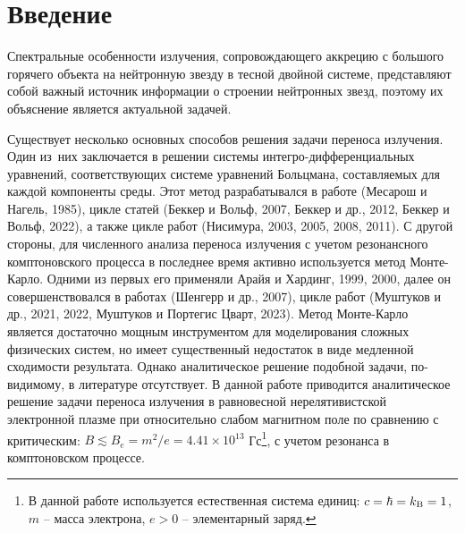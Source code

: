\documentclass{pazh2col-win}
\begin{document}


\section{Введение}
\label{introduction}

Спектральные особенности излучения, сопровождающего аккрецию с большого горячего объекта на нейтронную звезду в тесной двойной системе, представляют собой важный источник информации о строении нейтронных звезд, поэтому их объяснение является актуальной задачей.


Существует несколько основных способов решения задачи переноса излучения. Один из~них заключается в решении системы интегро-дифференциальных уравнений, соответствующих системе уравнений Больцмана, составляемых для каждой компоненты среды. Этот метод разрабатывался в работе (Месарош и Нагель, 1985), цикле статей (Беккер и Вольф, 2007, Беккер и др., 2012, Беккер и Вольф, 2022), а также цикле работ (Нисимура, 2003, 2005, 2008, 2011). С другой стороны, для численного анализа переноса излучения с учетом резонансного комптоновского процесса в последнее время активно используется метод Монте-Карло. Одними из первых его применяли Арайя и Хардинг, 1999, 2000, далее он совершенствовался в работах (Шенгерр и др., 2007), цикле работ (Муштуков и др., 2021, 2022, Муштуков и Портегис Цварт, 2023). Метод Монте-Карло является достаточно мощным инструментом для моделирования сложных физических систем, но имеет существенный недостаток в виде медленной сходимости результата. Однако аналитическое решение подобной задачи, по-видимому, в литературе отсутствует. В данной работе приводится аналитическое решение задачи переноса излучения в равновесной нерелятивистской электронной плазме при относительно слабом магнитном поле по сравнению с критическим: $B\lesssim B_e = m^2/e = 4.41 \times 10^{13}$ Гс\footnote{В данной работе используется естественная система единиц: $c = \hbar = k_{\rm{B}} = 1$, $m$ -- масса электрона, $e > 0$ -- элементарный заряд.}, с учетом резонанса в комптоновском процессе.
\end{document}
